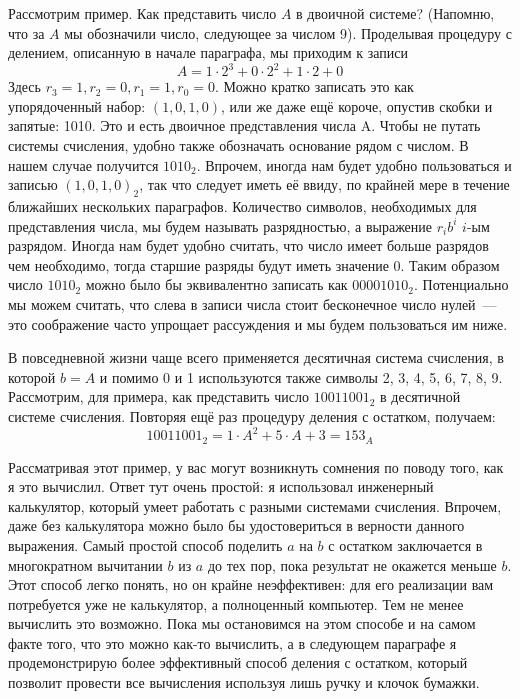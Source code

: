 Рассмотрим пример. Как представить число $A$ в двоичной системе? (Напомню, что за $A$ мы обозначили число, следующее за числом 9). Проделывая процедуру с делением, описанную в начале параграфа, мы приходим к записи
$$A = 1\cdot 2^3 + 0\cdot 2^2 + 1\cdot 2 + 0$$
Здесь $r_3 = 1, r_2 = 0, r_1 = 1, r_0 = 0$. Можно кратко записать это как упорядоченный набор: $(1, 0, 1, 0)$, или же даже ещё короче, опустив скобки и запятые: 1010. Это и есть двоичное представления числа A. Чтобы не путать системы счисления, удобно также обозначать основание рядом с числом. В нашем случае получится $1010_2$. Впрочем, иногда нам будет удобно пользоваться и записью $(1, 0, 1, 0)_2$, так что следует иметь её ввиду, по крайней мере в течение ближайших нескольких параграфов. Количество символов, необходимых для представления числа, мы будем называть разрядностью, а выражение $r_ib^i$ $i$-ым разрядом. Иногда нам будет удобно считать, что число имеет больше разрядов чем необходимо, тогда старшие разряды будут иметь значение 0. Таким образом число $1010_2$ можно было бы эквивалентно записать как $00001010_2$. Потенциально мы можем считать, что слева в записи числа стоит бесконечное число нулей~--- это соображение часто упрощает рассуждения и мы будем пользоваться им ниже.

В повседневной жизни чаще всего применяется десятичная система счисления, в которой $b=A$ и помимо 0 и 1 используются также символы 2, 3, 4, 5, 6, 7, 8, 9. Рассмотрим, для примера, как представить число $10011001_2$ в десятичной системе счисления. Повторяя ещё раз процедуру деления с остатком, получаем:
$$10011001_2 = 1\cdot A^2 + 5\cdot A + 3 = 153_A$$

Рассматривая этот пример, у вас могут возникнуть сомнения по поводу того, как я это вычислил. Ответ тут очень простой: я использовал инженерный калькулятор, который умеет работать с разными системами счисления. Впрочем, даже без калькулятора можно было бы удостовериться в верности данного выражения. Самый простой способ поделить $a$ на $b$ с остатком заключается в многократном вычитании $b$ из $a$ до тех пор, пока результат не окажется меньше $b$. Этот способ легко понять, но он крайне неэффективен: для его реализации вам потребуется уже не калькулятор, а полноценный компьютер. Тем не менее вычислить это возможно. Пока мы остановимся на этом способе и на самом факте того, что это можно как-то вычислить, а в следующем параграфе я продемонстрирую более эффективный способ деления с остатком, который позволит провести все вычисления используя лишь ручку и клочок бумажки.

